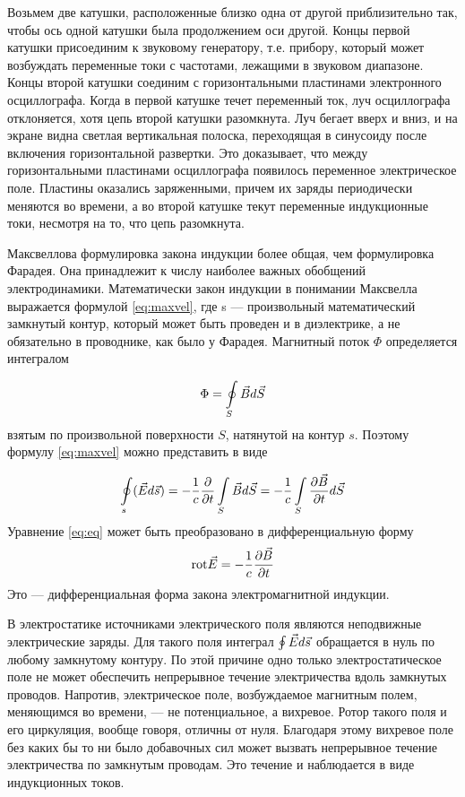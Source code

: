 Возьмем две катушки, расположенные
близко одна от другой приблизительно
так, чтобы ось одной катушки была
продолжением оси другой. Концы первой
катушки присоединим к звуковому
генератору, т.е. прибору, который может
возбуждать переменные токи с частотами,
лежащими в звуковом диапазоне. Концы
второй катушки соединим с
горизонтальными пластинами электронного
осциллографа. Когда в первой катушке
течет переменный ток, луч осциллографа
отклоняется, хотя цепь второй катушки
разомкнута. Луч бегает вверх и вниз, и
на экране видна светлая вертикальная
полоска, переходящая в синусоиду после
включения горизонтальной развертки. Это
доказывает, что между горизонтальными
пластинами осциллографа появилось
переменное электрическое поле. Пластины
оказались заряженными, причем их заряды
периодически меняются во времени, а во
второй катушке текут переменные
индукционные токи, несмотря на то, что
цепь разомкнута.

Максвеллова формулировка закона индукции
более общая, чем формулировка Фарадея.
Она принадлежит к числу наиболее важных
обобщений электродинамики. Математически
закон индукции в понимании Максвелла
выражается формулой \eqref{eq:maxvel}, где s —
произвольный математический замкнутый
контур, который может быть проведен и в
диэлектрике, а не обязательно в
проводнике, как было у Фарадея.
Магнитный поток $\Phi$ определяется
интегралом

\begin{equation}
    \Phi = \oint\limits_S \vec{B}d\vec{S}
    \label{eq:potok}
\end{equation}
взятым по произвольной поверхности $S$,
натянутой на контур $s$. Поэтому формулу
\eqref{eq:maxvel} можно представить в
виде

\begin{equation}
    \oint\limits_s(\vec{E}d\vec{s}) = -
    \frac{1}{c} \frac{\partial}{\partial
    t} \int\limits_S \vec{B} d\vec{S} = -
    \frac{1}{c} \int\limits_S
    \frac{\partial \vec{B}}{\partial
    t}d\vec{S}
    \label{eq:eq}
\end{equation}
Уравнение \eqref{eq:eq} может быть
преобразовано в дифференциальную форму
\begin{equation}
    \mathrm{rot} 
    \vec{E} = - \frac{1}{c} \frac{\partial
        \vec{B}}{\partial t}
    \label{eq:rot}
\end{equation}
Это --- дифференциальная форма закона
электромагнитной индукции. 

В электростатике источниками
электрического поля являются неподвижные
электрические заряды. Для такого поля
интеграл $\oint \vec{E}d\vec{s}$ обращается в нуль по
любому замкнутому контуру. По этой
причине одно только электростатическое
поле не может обеспечить непрерывное
течение электричества вдоль замкнутых
проводов. Напротив, электрическое поле,
возбуждаемое магнитным полем, меняющимся
во времени, — не потенциальное, а
вихревое. Ротор такого поля и его
циркуляция, вообще говоря, отличны от
нуля. Благодаря этому вихревое поле без
каких бы то ни было добавочных сил может
вызвать непрерывное течение
электричества по замкнутым проводам. Это
течение и наблюдается в виде
индукционных токов.


